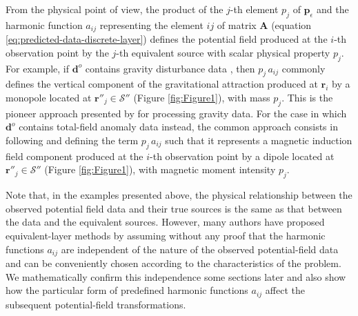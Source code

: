 \documentclass[manuscript,noblind]{geophysics}
\begin{document}
	From the physical point of view, the product of the $j$-th element $p_{j}$ of $\mathbf{p}_{\epsilon}$ 
	and the harmonic function $a_{ij}$ representing the element $ij$ of matrix $\mathbf{A}$ 
	(equation \ref{eq:predicted-data-discrete-layer}) defines the potential field produced at the $i$-th observation
	point by the $j$-th equivalent source with scalar physical property $p_{j}$.
	For example, if $\mathbf{d}^{o}$ contains gravity disturbance data
	\cite[e.g.,][ p. 93]{hofmann-wellenhof-moritz2005}, then
	$p_{j} \, a_{ij}$ commonly defines the vertical component of the gravitational attraction
	produced at $\mathbf{r}_{i}$ by a monopole located at
	$\mathbf{r}''_{j} \in \mathcal{S}''$ (Figure \ref{fig:Figure1}), with mass $p_{j}$. 
	This is the pioneer approach presented by \cite{dampney1969} for 
	processing gravity data.
	For the case in which $\mathbf{d}^{o}$ contains total-field anomaly data 
	\cite[e.g.,][ p. 178]{blakely1996} instead, the common approach consists in
	following \cite{emilia1973} and defining the term $p_{j} \, a_{ij}$ such
	that it represents a magnetic induction field component 
	produced at the $i$-th observation point by a dipole located at 
	$\mathbf{r}''_{j} \in \mathcal{S}''$ (Figure \ref{fig:Figure1}), with magnetic moment intensity $p_{j}$.
	
	Note that, in the examples presented above, the physical relationship 
	between the observed potential field data and their true sources is the
	same as that between the data and the equivalent sources.
	However, many authors 
	\cite[e.g.,][]{cordell1992, guspi_novara2009, li_etal2014, soler_uieda2021} 
	have proposed equivalent-layer methods by assuming without any proof that the harmonic functions $a_{ij}$ are 
	independent of the nature of the observed potential-field data and can be 
	conveniently chosen according to the characteristics of the problem.
	We mathematically confirm this independence some sections later and also show how 
	the particular form of predefined harmonic functions $a_{ij}$ affect the subsequent 
	potential-field transformations.
	
\end{document}
